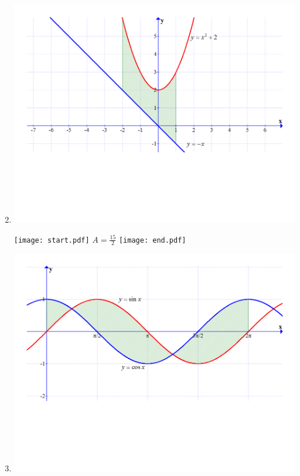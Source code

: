 \documentclass[12pt]{article}
\begin{document}
\begin{enumerate}
\setcounter{enumi}{1}

\item \text{ }

\begin{center}

\includegraphics[scale=0.3]{graph1.pdf}

\texttt{[image: start.pdf]}
{{$A=\frac{15}{2}$}}
\texttt{[image: end.pdf]}


\end{center}

\item \text{ }

\begin{center}

\includegraphics[scale=0.3]{graph2.pdf}


\end{center}
\end{enumerate}
\end{document}
